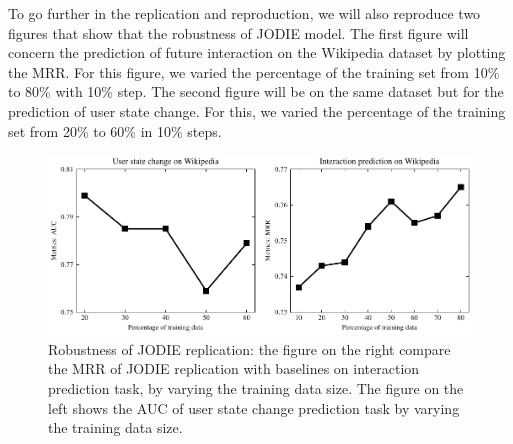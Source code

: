To go further in the replication and reproduction, we will also reproduce two figures that show that the robustness of JODIE model. The first figure will concern the prediction of future interaction on the Wikipedia dataset by plotting the MRR. For this figure, we varied the percentage of the training set from 10\% to 80\% with 10\% step. The second figure will be on the same dataset but for the prediction of user state change. For this, we varied the percentage of the training set from 20\% to 60\% in 10\% steps.



\begin{figure}[H]
    \centering
    \includegraphics[width = \textwidth]{image/percentage_train.pdf}
    \caption{Robustness of JODIE replication: the figure on the right compare the MRR of JODIE replication with baselines on interaction prediction task, by varying the training data size. The figure on the left shows the AUC of user state change prediction task by varying the training data size.}
    \label{fig:my_label}
\end{figure}



